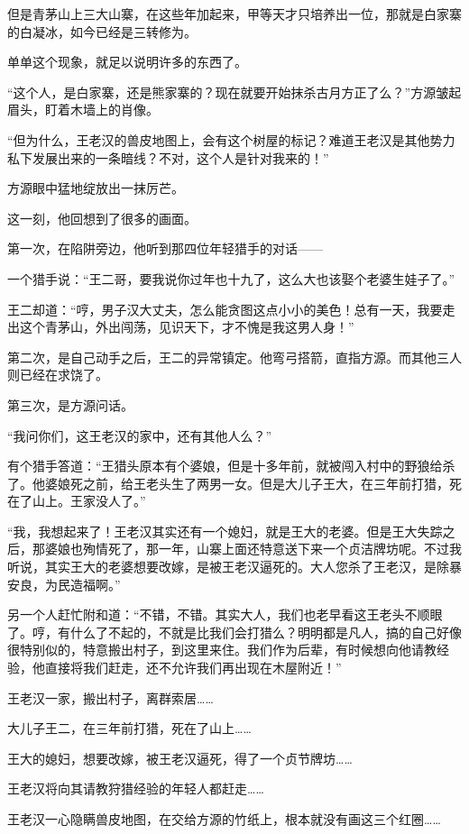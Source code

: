 \begin{this_body}
但是青茅山上三大山寨，在这些年加起来，甲等天才只培养出一位，那就是白家寨的白凝冰，如今已经是三转修为。

单单这个现象，就足以说明许多的东西了。

“这个人，是白家寨，还是熊家寨的？现在就要开始抹杀古月方正了么？”方源皱起眉头，盯着木墙上的肖像。

“但为什么，王老汉的兽皮地图上，会有这个树屋的标记？难道王老汉是其他势力私下发展出来的一条暗线？不对，这个人是针对我来的！”

方源眼中猛地绽放出一抹厉芒。

这一刻，他回想到了很多的画面。

第一次，在陷阱旁边，他听到那四位年轻猎手的对话——

一个猎手说：“王二哥，要我说你过年也十九了，这么大也该娶个老婆生娃子了。”

王二却道：“哼，男子汉大丈夫，怎么能贪图这点小小的美色！总有一天，我要走出这个青茅山，外出闯荡，见识天下，才不愧是我这男人身！”

第二次，是自己动手之后，王二的异常镇定。他弯弓搭箭，直指方源。而其他三人则已经在求饶了。

第三次，是方源问话。

“我问你们，这王老汉的家中，还有其他人么？”

有个猎手答道：“王猎头原本有个婆娘，但是十多年前，就被闯入村中的野狼给杀了。他婆娘死之前，给王老头生了两男一女。但是大儿子王大，在三年前打猎，死在了山上。王家没人了。”

“我，我想起来了！王老汉其实还有一个媳妇，就是王大的老婆。但是王大失踪之后，那婆娘也殉情死了，那一年，山寨上面还特意送下来一个贞洁牌坊呢。不过我听说，其实王大的老婆想要改嫁，是被王老汉逼死的。大人您杀了王老汉，是除暴安良，为民造福啊。”

另一个人赶忙附和道：“不错，不错。其实大人，我们也老早看这王老头不顺眼了。哼，有什么了不起的，不就是比我们会打猎么？明明都是凡人，搞的自己好像很特别似的，特意搬出村子，到这里来住。我们作为后辈，有时候想向他请教经验，他直接将我们赶走，还不允许我们再出现在木屋附近！”

王老汉一家，搬出村子，离群索居……

大儿子王二，在三年前打猎，死在了山上……

王大的媳妇，想要改嫁，被王老汉逼死，得了一个贞节牌坊……

王老汉将向其请教狩猎经验的年轻人都赶走……

王老汉一心隐瞒兽皮地图，在交给方源的竹纸上，根本就没有画这三个红圈……


\end{this_body}

